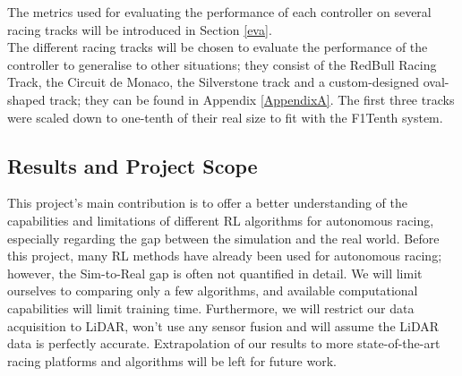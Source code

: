 The metrics used for evaluating the performance of each controller on several racing tracks will be introduced in Section \ref{eva}. \\

The different racing tracks will be chosen to evaluate the performance of the controller to generalise to other situations; they consist of the RedBull Racing Track, the Circuit de Monaco, the Silverstone track and a custom-designed oval-shaped track; they can be found in Appendix \ref{AppendixA}. The first three tracks were scaled down to one-tenth of their real size to fit with the F1Tenth system.

\subsection*{Results and Project Scope}
This project's main contribution is to offer a better understanding of the capabilities and limitations of different RL algorithms for autonomous racing, especially regarding the gap between the simulation and the real world. Before this project, many RL methods have already been used for autonomous racing; however, the Sim-to-Real gap is often not quantified in detail. We will limit ourselves to comparing only a few algorithms, and available computational capabilities will limit training time. Furthermore, we will restrict our data acquisition to LiDAR, won't use any sensor fusion and will assume the LiDAR data is perfectly accurate. \newline
Extrapolation of our results to more state-of-the-art racing platforms and algorithms will be left for future work.
\newpage